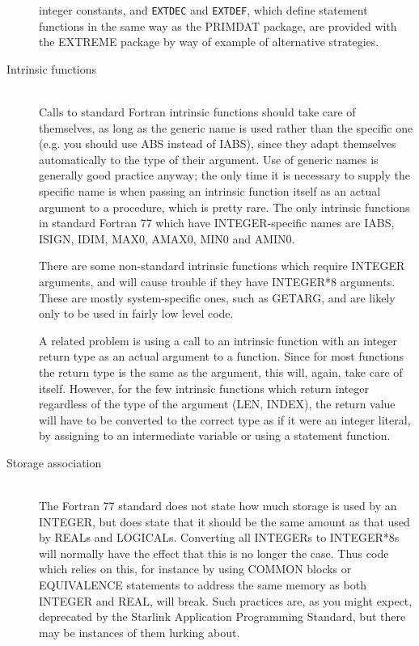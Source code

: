 \documentclass[twoside,11pt]{article}
\newcommand{\html}[1]{}
\newcommand{\xref}[3]{#1}
\renewcommand{\_}{\texttt{\symbol{95}}}
\newcommand{\file}[1]{{\tt #1}}
\newcommand{\ditem}[1]{\item[#1]\mbox{}\\}
\newenvironment{squote}{\begin{quote}\begin{small}}{\end{small}\end{quote}}
\begin{document}
\begin{description}
integer constants, and \file{EXT\_DEC} and \file{EXT\_DEF},
which define statement functions in the same way as the
\xref{PRIMDAT}{sun39}{} package, are provided with the EXTREME
package by way of example of alternative strategies.
\html{\begin{squote}\end{squote}}
%
\ditem{Intrinsic functions}
Calls to standard Fortran intrinsic functions should take care of themselves,
as long as the generic name is used rather than the specific one
(e.g. you should use ABS instead of IABS),
since they adapt themselves automatically to the type of their argument.
Use of generic names is generally good practice anyway;
the only time it is necessary to supply the specific name is
when passing an intrinsic function itself as an actual argument
to a procedure, which is pretty rare.
The only intrinsic functions in standard Fortran 77 which have
INTEGER-specific names are IABS, ISIGN, IDIM, MAX0, AMAX0, MIN0 and AMIN0.

There are some non-standard intrinsic functions which require INTEGER
arguments, and will cause trouble if they have INTEGER*8 arguments.
These are mostly system-specific ones, such as GETARG,
and are likely only to be used in fairly low level code.

A related problem is using a call to an intrinsic function with
an integer return type as an actual argument to a function.
Since for most functions the return type is the same as the argument,
this will, again, take care of itself.  However, for the few
intrinsic functions which return integer regardless of the type of
the argument (LEN, INDEX), the return value will have to be converted to
the correct type as if it were an integer literal,
by assigning to an intermediate variable or using a statement function.
\html{\begin{squote}\end{squote}}
%
\ditem{Storage association}
The Fortran 77 standard does not state how much storage is used by
an INTEGER, but does state that it should be the same amount as that
used by REALs and LOGICALs.
Converting all INTEGERs to INTEGER*8s will
normally have the effect that this is no longer the case.
Thus code which relies on this, for instance by using COMMON blocks or
EQUIVALENCE statements to address the same memory as both INTEGER and REAL,
will break.
Such practices are, as you might expect, deprecated by the
\xref{Starlink Application Programming Standard}{sgp16}{},
but there may be instances of them lurking about.


\end{description}
\end{document}

